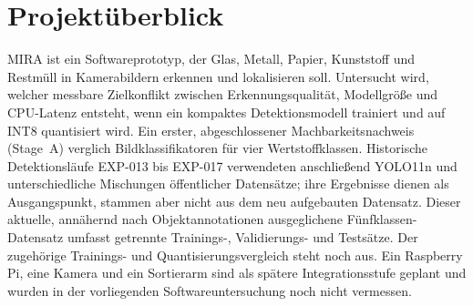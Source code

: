 \section*{Projektüberblick}

MIRA ist ein Softwareprototyp, der Glas, Metall, Papier, Kunststoff und Restmüll in Kamerabildern erkennen und lokalisieren soll. Untersucht wird, welcher messbare Zielkonflikt zwischen Erkennungsqualität, Modellgröße und CPU-Latenz entsteht, wenn ein kompaktes Detektionsmodell trainiert und auf INT8 quantisiert wird. Ein erster, abgeschlossener Machbarkeitsnachweis (Stage~A) verglich Bildklassifikatoren für vier Wertstoffklassen. Historische Detektionsläufe EXP-013 bis EXP-017 verwendeten anschließend YOLO11n und unterschiedliche Mischungen öffentlicher Datensätze; ihre Ergebnisse dienen als Ausgangspunkt, stammen aber nicht aus dem neu aufgebauten Datensatz. Dieser aktuelle, annähernd nach Objektannotationen ausgeglichene Fünfklassen-Datensatz umfasst getrennte Trainings-, Validierungs- und Testsätze. Der zugehörige Trainings- und Quantisierungsvergleich steht noch aus. Ein Raspberry Pi, eine Kamera und ein Sortierarm sind als spätere Integrationsstufe geplant und wurden in der vorliegenden Softwareuntersuchung noch nicht vermessen.
